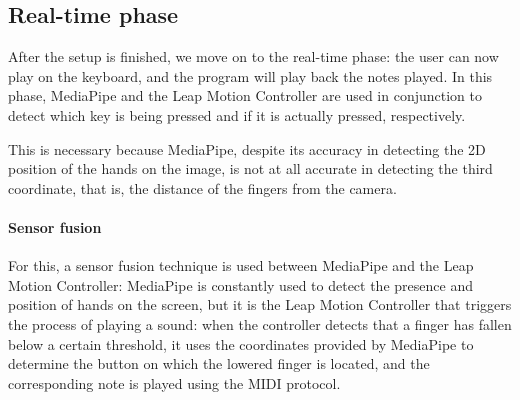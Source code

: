 \subsection{Real-time phase}\label{subsec:real-time-phase-prototype}
After the setup is finished, we move on to the real-time phase: the user can now play on the
keyboard, and the program will play back the notes played.
In this phase, MediaPipe and the Leap Motion Controller are used in conjunction to detect which key is being pressed
and if it is actually pressed, respectively.

This is necessary because MediaPipe, despite its accuracy in detecting the 2D position of the hands on the image,
is not at all accurate in detecting the third coordinate, that is, the distance of the fingers from the camera.

\paragraph{Sensor fusion}
For this, a sensor fusion technique is used between MediaPipe and the Leap Motion Controller: MediaPipe is
constantly used to detect the presence and position of hands on the screen, but it is the Leap Motion
Controller that triggers the process of playing a sound: when the controller detects that a finger has fallen
below a certain threshold, it uses the coordinates provided by MediaPipe to determine the button on which the
lowered finger is located, and the corresponding note is played using the MIDI protocol\@.
